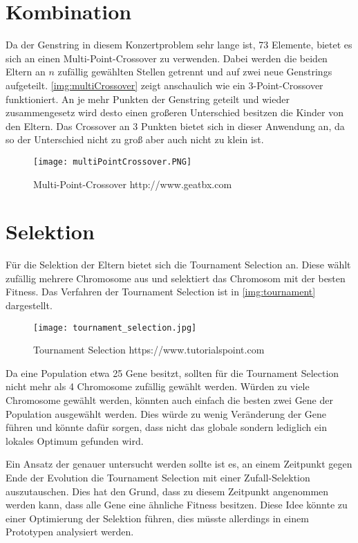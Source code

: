 \section{Kombination}\label{sec:eltern}
Da der Genstring in diesem Konzertproblem sehr lange ist, 73 Elemente, bietet es sich an einen Multi-Point-Crossover zu verwenden.
Dabei werden die beiden Eltern an $n$ zufällig gewählten Stellen getrennt und auf zwei neue Genstrings aufgeteilt.
\autoref{img:multiCrossover} zeigt anschaulich wie ein 3-Point-Crossover funktioniert. An je mehr Punkten
der Genstring geteilt und wieder zusammengesetz wird desto einen großeren Unterschied besitzen die Kinder von
den Eltern. Das Crossover an 3 Punkten bietet sich in dieser Anwendung an, da so der Unterschied nicht zu groß aber auch nicht zu klein ist.

\begin{figure}[h]
    \begin{minipage}{\textwidth}
	    \centering
        \texttt{[image: multiPointCrossover.PNG]}
	    \caption{Multi-Point-Crossover {http://www.geatbx.com}}
        \label{img:multiCrossover}
    \end{minipage}
\end{figure}

\section{Selektion}
Für die Selektion der Eltern bietet sich die Tournament Selection an.
Diese wählt zufällig mehrere Chromosome aus und selektiert das Chromosom mit der besten Fitness. Das Verfahren der
Tournament Selection ist in \autoref{img:tournament} dargestellt.


\begin{figure}
    \begin{minipage}{\textwidth}
        \texttt{[image: tournament\_selection.jpg]}
        \caption{Tournament Selection {https://www.tutorialspoint.com}}
        \label{img:tournament}
    \end{minipage}
\end{figure}

Da eine Population etwa 25 Gene besitzt, sollten für die Tournament Selection nicht mehr als 4 Chromosome zufällig gewählt werden.
Würden zu viele Chromosome gewählt werden, könnten auch einfach die besten zwei Gene der Population ausgewählt werden.
Dies würde zu wenig Veränderung der Gene führen und könnte dafür sorgen, dass nicht das globale sondern
lediglich ein lokales Optimum gefunden wird.

Ein Ansatz der genauer untersucht werden sollte ist es, an einem Zeitpunkt gegen Ende der
Evolution die Tournament Selection mit einer Zufall-Selektion auszutauschen.
Dies hat den Grund, dass zu diesem Zeitpunkt angenommen werden kann, dass alle
Gene eine ähnliche Fitness besitzen. Diese Idee könnte zu einer Optimierung der Selektion führen, dies 
müsste allerdings in einem Prototypen analysiert werden. 